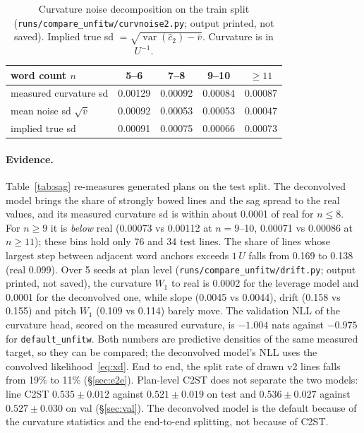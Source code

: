 \documentclass[11pt,a4paper]{article}
\newcommand{\U}{\ensuremath{U}}
\newcommand{\src}[1]{{\footnotesize\texttt{#1}}}
\begin{document}
\begin{table}[H]\centering\small
\begin{tabular}{lcccc}
\toprule
word count $n$ & 5--6 & 7--8 & 9--10 & $\ge11$\\
\midrule
measured curvature sd       & 0.00129 & 0.00092 & 0.00084 & 0.00087\\
mean noise sd $\sqrt{\bar v}$ & 0.00092 & 0.00053 & 0.00053 & 0.00047\\
implied true sd             & 0.00091 & 0.00075 & 0.00066 & 0.00073\\
\bottomrule
\end{tabular}
\caption{Curvature noise decomposition on the train split
(\src{runs/compare\_unfitw/curvnoise2.py}; output printed, not saved). Implied
true sd $=\sqrt{\operatorname{var}(\hat c_2)-\bar v}$. Curvature is in
$\U^{-1}$.}
\label{tab:curvnoise}
\end{table}

\paragraph{Evidence.} Table~\ref{tab:sag} re-measures generated plans on the
test split. The deconvolved model brings the share of strongly bowed lines and
the sag spread to the real values, and its measured curvature sd is within
about 0.0001 of real for $n\le8$. For $n\ge9$ it is \emph{below} real (0.00073
vs 0.00112 at $n=9$--10, 0.00071 vs 0.00086 at $n\ge11$); these bins hold
only 76 and 34 test lines. The share of lines whose largest step between
adjacent word anchors exceeds $1\,\U$ falls from 0.169 to 0.138 (real 0.099).
Over 5 seeds at plan level (\src{runs/compare\_unfitw/drift.py}; output
printed, not saved), the curvature $W_1$ to real is 0.0002 for the leverage
model and 0.0001 for the deconvolved one, while slope (0.0045 vs 0.0044),
drift (0.158 vs 0.155) and pitch $W_1$ (0.109 vs 0.114) barely move. The
validation NLL of the curvature head, scored on the measured curvature, is
$-1.004$ nats against $-0.975$ for \texttt{default\_unfitw}. Both numbers are
predictive densities of the same measured target, so they can be compared; the
deconvolved model's NLL uses the convolved likelihood~\eqref{eq:xd}. End to
end, the split rate of drawn v2 lines falls from 19\% to 11\%
(\S\ref{sec:e2e}). Plan-level C2ST does not separate the two models: line
C2ST $0.535\pm0.012$ against $0.521\pm0.019$ on test and $0.536\pm0.027$
against $0.527\pm0.030$ on val (\S\ref{sec:val}). The deconvolved model is the
default because of the curvature statistics and the end-to-end splitting, not
because of C2ST.
\end{document}
